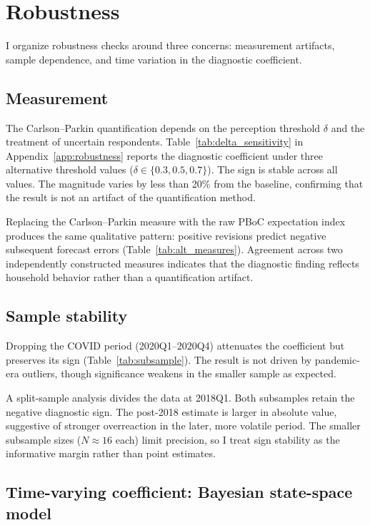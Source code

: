 \section{Robustness}\label{sec:robustness}

I organize robustness checks around three concerns:
measurement artifacts, sample dependence, and time
variation in the diagnostic coefficient.

\subsection{Measurement}

The Carlson--Parkin quantification depends on the
perception threshold $\delta$ and the treatment of
uncertain respondents. Table~\ref{tab:delta_sensitivity}
in Appendix~\ref{app:robustness} reports the diagnostic
coefficient under three alternative threshold values
($\delta \in \{0.3, 0.5, 0.7\}$). The sign is stable
across all values. The magnitude varies by less than
20\% from the baseline, confirming that the result is
not an artifact of the quantification method.

Replacing the Carlson--Parkin measure with the raw PBoC
expectation index produces the same qualitative pattern:
positive revisions predict negative subsequent forecast
errors (Table~\ref{tab:alt_measures}). Agreement across
two independently constructed measures indicates that
the diagnostic finding reflects household behavior
rather than a quantification artifact.

\subsection{Sample stability}

Dropping the COVID period (2020Q1--2020Q4) attenuates
the coefficient but preserves its sign
(Table~\ref{tab:subsample}). The result is not driven
by pandemic-era outliers, though significance weakens
in the smaller sample as expected.

A split-sample analysis divides the data at 2018Q1.
Both subsamples retain the negative diagnostic sign.
The post-2018 estimate is larger in absolute value,
suggestive of stronger overreaction in the later,
more volatile period. The smaller subsample sizes
($N \approx 16$ each) limit precision, so I treat
sign stability as the informative margin rather than
point estimates.

\subsection{Time-varying coefficient: Bayesian
  state-space model}

